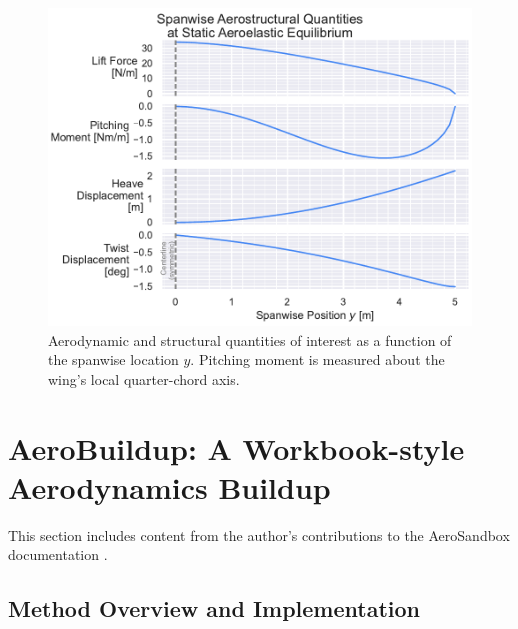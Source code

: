 \begin{figure}[h]
    \centering
    \includegraphics[width=\textwidth]{../figures/aerostructural/spanplot.pdf}
    \caption{Aerodynamic and structural quantities of interest as a function of the spanwise location $y$. Pitching moment is measured about the wing's local quarter-chord axis.}
    \label{fig:as_spanplot}
\end{figure}



\section{AeroBuildup: A Workbook-style Aerodynamics Buildup}
\label{sec:aerobuildup}

\begin{attrib}
    This section includes content from the author's contributions to the AeroSandbox documentation \cite{asb_github}.
\end{attrib}

\subsection{Method Overview and Implementation}

